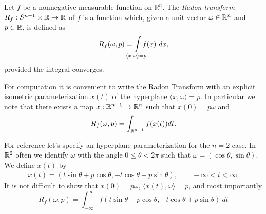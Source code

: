 \begin{definition}
  Let $f$ be a nonnegative measurable function on $\mathbb{R}^n$. The \emph{Radon transform} $R_f : S^{n-1} \times \mathbb{R} \rightarrow \mathbb{R}$ of $f$ is a function which, given a unit vector $\omega \in \mathbb{R}^n$ and $p \in \mathbb{R}$, is defined as
  \[
    R_f(\omega, p) = \int\mclimits_{\langle x, \omega \rangle = p} f(x) ~dx,
  \]
  provided the integral converges.
\end{definition}

\begin{myexample}
  For computation it is convenient to write the Radon Transform with an explicit isometric parameterization $x(t)$ of the hyperplane $\langle x, \omega\rangle = p$. In particular we note that there exists a map $x : \mathbb{R}^{n-1} \rightarrow \mathbb{R}^n$ such that $x(0) = p\omega$ and
  \[
    R_f(\omega, p) = \int_{\mathbb{R}^{n-1}} f(x(t)) dt.
  \]

  For reference let's specify an hyperplane parameterization for the $n=2$ case. In $\mathbb{R}^2$ often we identify $\omega$ with the angle $0 \leq \theta < 2\pi$ such that $\omega = (\cos \theta, \sin \theta)$. We define $x(t)$ by
  \begin{align*}
    x(t) = (t \sin \theta + p \cos \theta, -t \cos \theta + p \sin \theta), \qquad -\infty < t < \infty.
  \end{align*}
  It is not difficult to show that $x(0) = p\omega$, $\langle x(t), \omega \rangle = p$, and most importantly
  \[
    R_f(\omega, p) = \int_{-\infty}^\infty f(t \sin \theta + p \cos \theta, -t \cos \theta + p \sin \theta)~dt
  \]
\end{myexample}

